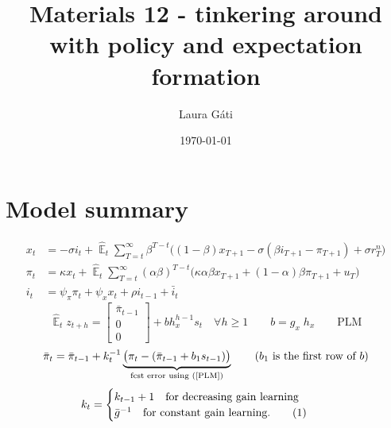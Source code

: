 \documentclass[11pt]{article}
\renewcommand{\[}{\begin{equation}}
\renewcommand{\]}{\end{equation}}
\DeclareMathOperator{\E}{\mathbb{E}}
\newcommand\numberthis{\addtocounter{equation}{1}\tag{\theequation}} %
\begin{document}
\linespread{1.0}

\title{Materials 12 - tinkering around with policy and expectation formation}
\author{Laura G\'ati} 
\date{\today}
\maketitle


\tableofcontents


\section{Model summary}
\begin{align}
x_t &=  -\sigma i_t +\hat{\E}_t \sum_{T=t}^{\infty} \beta^{T-t }\big( (1-\beta)x_{T+1} - \sigma(\beta i_{T+1} - \pi_{T+1}) +\sigma r_T^n \big)  \label{prestons18}  \\
\pi_t &= \kappa x_t +\hat{\E}_t \sum_{T=t}^{\infty} (\alpha\beta)^{T-t }\big( \kappa \alpha \beta x_{T+1} + (1-\alpha)\beta \pi_{T+1} + u_T\big) \label{prestons19}  \\
i_t &= \psi_{\pi}\pi_t + \psi_{x} x_t  + \rho i_{t-1} + \bar{i}_t \label{TR}
\end{align}
\begin{equation}
\hat{\E}_t z_{t+h} =  \begin{bmatrix}\bar{\pi}_{t-1} \\ 0 \\ 0 \end{bmatrix}+ bh_x^{h-1}s_t  \quad \forall h\geq 1 \quad \quad b = g_x \; h_x \quad \quad \text{PLM} \label{PLM}
\end{equation}
\begin{equation}
\bar{\pi}_{t} = \bar{\pi}_{t-1} +k_t^{-1}\underbrace{\big(\pi_{t} -(\bar{\pi}_{t-1}+b_1s_{t-1}) \big)}_{\text{fcst error using (\ref{PLM})} } \quad \quad  \text{($b_1$ is the first row of $b$)}
\end{equation}
 \begin{align*}
k_t & = \begin{cases} k_{t-1}+1 \quad \text{for decreasing gain learning}  \\ \bar{g}^{-1}  \quad \text{for constant gain learning.}\numberthis
\end{cases} 
\end{align*}

\newpage
\end{document}
